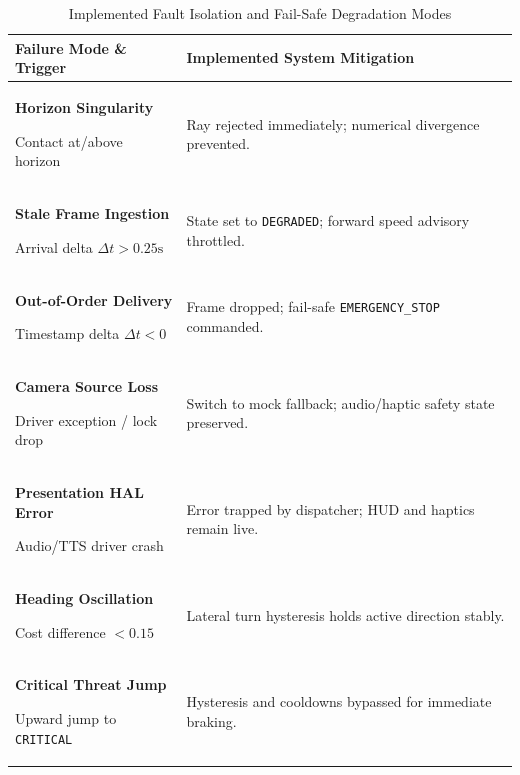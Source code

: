 \begin{table}[t]
\caption{Implemented Fault Isolation and Fail-Safe Degradation Modes}
\label{tab:failure_modes}
\centering
\footnotesize
\setlength{\tabcolsep}{4pt}
\begin{tabularx}{\columnwidth}{p{2.6cm}X}
\toprule
\textbf{Failure Mode \& Trigger} & \textbf{Implemented System Mitigation} \\
\midrule
\textbf{Horizon Singularity}\par\scriptsize Contact at/above horizon & Ray rejected immediately; numerical divergence prevented. \\
\addlinespace[2pt]
\textbf{Stale Frame Ingestion}\par\scriptsize Arrival delta $\Delta t > 0.25\text{s}$ & State set to \texttt{DEGRADED}; forward speed advisory throttled. \\
\addlinespace[2pt]
\textbf{Out-of-Order Delivery}\par\scriptsize Timestamp delta $\Delta t < 0$ & Frame dropped; fail-safe \texttt{EMERGENCY\_STOP} commanded. \\
\addlinespace[2pt]
\textbf{Camera Source Loss}\par\scriptsize Driver exception / lock drop & Switch to mock fallback; audio/haptic safety state preserved. \\
\addlinespace[2pt]
\textbf{Presentation HAL Error}\par\scriptsize Audio/TTS driver crash & Error trapped by dispatcher; HUD and haptics remain live. \\
\addlinespace[2pt]
\textbf{Heading Oscillation}\par\scriptsize Cost difference $< 0.15$ & Lateral turn hysteresis holds active direction stably. \\
\addlinespace[2pt]
\textbf{Critical Threat Jump}\par\scriptsize Upward jump to \texttt{CRITICAL} & Hysteresis and cooldowns bypassed for immediate braking. \\
\bottomrule
\end{tabularx}
\end{table}
